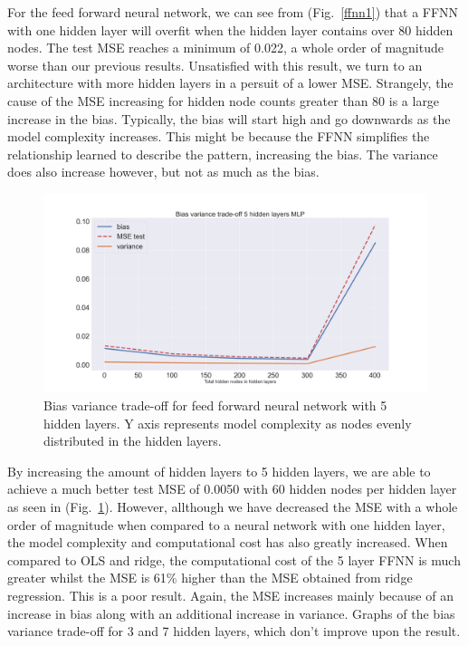 \documentclass[onecolumn,10pt,cleanfoot]{asme2ej}
\begin{document}
For the feed forward neural network, we can see from (Fig.~\ref{ffnn1}) that a FFNN with one hidden layer will overfit when the hidden layer contains over 80 hidden nodes. The test MSE reaches a minimum of 0.022, a whole order of magnitude worse than our previous results. Unsatisfied with this result, we turn to an architecture with more hidden layers in a persuit of a lower MSE. Strangely, the cause of the MSE increasing for hidden node counts greater than 80 is a large increase in the bias. Typically, the bias will start high and go downwards as the model complexity increases. This might be because the FFNN simplifies the relationship learned to describe the pattern, increasing the bias. The variance does also increase however, but not as much as the bias.

\begin{figure}[H]
\centerline{\includegraphics[width=5in]{figs/BV_ffnn5.png}}
\caption{Bias variance trade-off for feed forward neural network with 5 hidden layers. Y axis represents model complexity as nodes evenly distributed in the hidden layers.}
\label{ffnn5}
\end{figure}

By increasing the amount of hidden layers to 5 hidden layers, we are able to achieve a much better test MSE of 0.0050 with 60 hidden nodes per hidden layer as seen in (Fig.~\ref{ffnn5}). However, allthough we have decreased the MSE with a whole order of magnitude when compared to a neural network with one hidden layer, the model complexity and computational cost has also greatly increased. When compared to OLS and ridge, the computational cost of the 5 layer FFNN is much greater whilst the MSE is 61\% higher than the MSE obtained from ridge regression. This is a poor result. Again, the MSE increases mainly because of an increase in bias along with an additional increase in variance. Graphs of the bias variance trade-off for 3 and 7 hidden layers, which don't improve upon the result.
\end{document}
